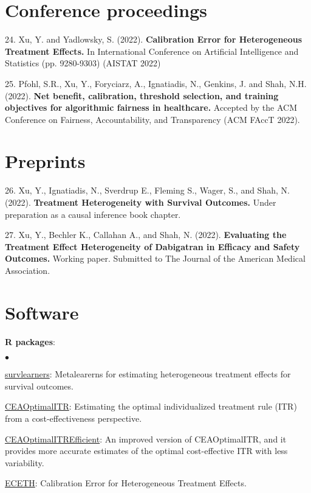 \documentclass[margin,line]{res}
\newenvironment{list1}{
  \begin{list}{\ding{113}}{%
      \setlength{\itemsep}{0in}
      \setlength{\parsep}{0in} \setlength{\parskip}{0in}
      \setlength{\topsep}{0in} \setlength{\partopsep}{0in}
      \setlength{\leftmargin}{0.17in}}}{\end{list}}
\newenvironment{list2}{
  \begin{list}{$\bullet$}{%
      \setlength{\itemsep}{0in}
      \setlength{\parsep}{0in} \setlength{\parskip}{0in}
      \setlength{\topsep}{0in} \setlength{\partopsep}{0in}
      \setlength{\leftmargin}{0.2in}}}{\end{list}}
\begin{document}
\begin{resume}
\section{\sc Conference proceedings}
\begin{list1}
\item[24.] Xu, Y. and Yadlowsky, S. (2022). \textbf{Calibration Error for Heterogeneous Treatment Effects.} In International Conference on Artificial Intelligence and Statistics (pp. 9280-9303) (AISTAT 2022)
\item[25.] Pfohl, S.R., Xu, Y., Foryciarz, A., Ignatiadis, N., Genkins, J. and Shah, N.H. (2022). \textbf{Net benefit, calibration, threshold selection, and training objectives for algorithmic fairness in healthcare.} Accepted by the ACM Conference on Fairness, Accountability, and Transparency (ACM FAccT 2022). 
\end{list1}

\section{\sc Preprints}
\begin{list1}
\item[26.] Xu, Y., Ignatiadis, N., Sverdrup E., Fleming S., Wager, S.,  and Shah, N. (2022). \textbf{Treatment Heterogeneity with Survival Outcomes.} Under preparation as a causal inference book chapter. \\ 
\item[27.] Xu, Y., Bechler K., Callahan A.,  and Shah, N. (2022). \textbf{Evaluating the Treatment Effect Heterogeneity of Dabigatran in Efficacy and Safety Outcomes.} Working paper. Submitted to The Journal of the American Medical Association. \\
\end{list1}


\section{\sc Software}
{\bf R packages}:
\begin{list2}
\item \href{https://github.com/som-shahlab/survlearners/tree/master/r-package/survlearners}{{\color{urlblue} survlearners}}: Metalearerns for estimating heterogeneous treatment effects for survival outcomes.
\item \href{https://github.com/CrystalXuR/CEAOptimalITR}{{\color{urlblue} CEAOptimalITR}}: Estimating the optimal individualized treatment rule (ITR) from
a cost-effectiveness perspective.
\item \href{https://github.com/CrystalXuR/EfficientCEITR}{{\color{urlblue} CEAOptimalITREfficient}}: An improved version of CEAOptimalITR, and it provides
more accurate estimates of the optimal cost-effective ITR with less variability.
\item \href{https://github.com/CrystalXuR/ECETH}{{\color{urlblue} ECETH}}: Calibration Error for Heterogeneous Treatment Effects.
\end{list2}



\end{resume}
\end{document}
